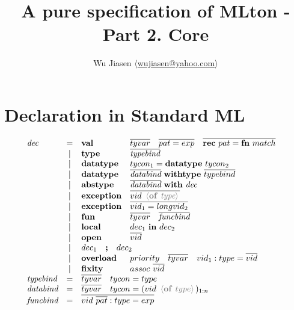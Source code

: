 \documentclass[11pt,a4paper]{article}
\newcommand{\key}[1]{\textrm{\textbf{#1}}}
\newcommand{\prodlhs}[1]{\textit{#1}}
\newcommand{\angled}[1]{\,{\color{gray}\langle#1\rangle}\,}
\newcommand{\vect}[1]{\overline{#1}}
\begin{document}
\title {A pure specification of MLton - Part 2. Core}
\author{Wu Jiasen $\langle$\href{mailto:wujiasen@yahoo.com}{wujiasen@yahoo.com}$\rangle$}
\maketitle 
\thispagestyle{fancy}

\section{Declaration in Standard ML}
{\renewcommand{\arraystretch}{1.2}\[
\begin{array}{lclll}
\prodlhs{dec}
     & = & \key{val}  	  & \vect{tyvar} \quad \vect{pat = exp} \quad \vect{\key{rec}\ pat = \key{fn}\ match} &\\
     & | & \key{type} 	  & \vect{\prodlhs{typebind}}                                &\\
     & | & \key{datatype} & tycon_1 = \key{datatype}\ tycon_2                            &\\
     & | & \key{datatype} & \vect{\prodlhs{databind}} \ \key{withtype}\ \vect{typebind} &\\
     & | & \key{abstype}  & \vect{\prodlhs{databind}} \ \key{with}\ \prodlhs{dec}      &\\
     & | & \key{exception}& \vect{vid\ \angled{\key{of}\ \prodlhs{type}}}   &\\
     & | & \key{exception}& \vect{vid_1 = longvid_2}               &\\
     & | & \key{fun}      & \vect{tyvar} \quad \vect{\prodlhs{funcbind}} &\\
     & | & \key{local}    & \prodlhs{$dec_1$} \ \key{in}\ \prodlhs{$dec_2$}     &\\
     & | & \key{open}     & \vect{vid}                          	&\\
     & | & \multicolumn{2}{l}{\prodlhs{$dec_1$}\quad\key{;}\quad \prodlhs{$dec_2$}} &\\
     & | & \key{overload} & priority \quad \vect{tyvar} \quad vid_1:type=\vect{vid}&\\
     & | & \key{fixity}   & assoc\ \vect{vid}                      &\\
\prodlhs{typebind} 
     & = & \multicolumn{2}{l}{\vect{tyvar} \quad tycon = type } 		&\\
\prodlhs{databind}
	 & = & \multicolumn{2}{l}{\vect{tyvar} \quad tycon = (vid \ \angled{\key{of}\ type})_{1:n} } 		&\\
\prodlhs{funcbind}
	 & = & \multicolumn{2}{l}{\vect{vid \ \vect{pat}:type = exp}} &\\
\end{array}
\]}
\end{document}
